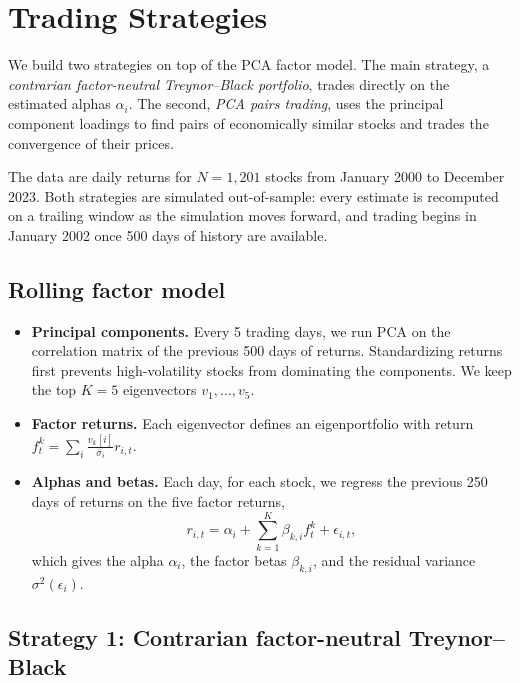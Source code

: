 \documentclass[12pt,letterpaper]{article}
\begin{document}


\section{Trading Strategies}

We build two strategies on top of the PCA factor model. The main strategy, a \emph{contrarian factor-neutral Treynor--Black portfolio}, trades directly on the estimated alphas $\alpha_i$. The second, \emph{PCA pairs trading}, uses the principal component loadings to find pairs of economically similar stocks and trades the convergence of their prices.

The data are daily returns for $N = 1{,}201$ stocks from January 2000 to December 2023. Both strategies are simulated out-of-sample: every estimate is recomputed on a trailing window as the simulation moves forward, and trading begins in January 2002 once 500 days of history are available.

\subsection{Rolling factor model}

\begin{itemize}
    \item \textbf{Principal components.} Every 5 trading days, we run PCA on the correlation matrix of the previous 500 days of returns. Standardizing returns first prevents high-volatility stocks from dominating the components. We keep the top $K = 5$ eigenvectors $v_1, \dots, v_5$.
    \item \textbf{Factor returns.} Each eigenvector defines an eigenportfolio with return $f^k_t = \sum_i \frac{v_k[i]}{\bar\sigma_i} r_{i,t}$.
    \item \textbf{Alphas and betas.} Each day, for each stock, we regress the previous 250 days of returns on the five factor returns,
    \[
        r_{i,t} = \alpha_i + \sum_{k=1}^{K} \beta_{k,i} f^k_t + \epsilon_{i,t},
    \]
    which gives the alpha $\alpha_i$, the factor betas $\beta_{k,i}$, and the residual variance $\sigma^2(\epsilon_i)$.
\end{itemize}

\subsection{Strategy 1: Contrarian factor-neutral Treynor--Black}
\end{document}
